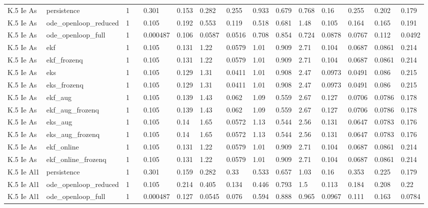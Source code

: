 \begin{table}[t]
\begin{tabular}{lllllllllllllll}
K.5 Ie As & persistence & 1 &  & 0.301 & 0.153 & 0.282 & 0.255 & 0.933 & 0.679 & 0.768 & 0.16 & 0.255 & 0.202 & 0.179 \\
K.5 Ie As & ode\_openloop\_reduced & 1 &  & 0.105 & 0.192 & 0.553 & 0.119 & 0.518 & 0.681 & 1.48 & 0.105 & 0.164 & 0.165 & 0.191 \\
K.5 Ie As & ode\_openloop\_full & 1 &  & 0.000487 & 0.106 & 0.0587 & 0.0516 & 0.708 & 0.854 & 0.724 & 0.0878 & 0.0767 & 0.112 & 0.0492 \\
K.5 Ie As & ekf & 1 &  & 0.105 & 0.131 & 1.22 & 0.0579 & 1.01 & 0.909 & 2.71 & 0.104 & 0.0687 & 0.0861 & 0.214 \\
K.5 Ie As & ekf\_frozenq & 1 &  & 0.105 & 0.131 & 1.22 & 0.0579 & 1.01 & 0.909 & 2.71 & 0.104 & 0.0687 & 0.0861 & 0.214 \\
K.5 Ie As & eks & 1 &  & 0.105 & 0.129 & 1.31 & 0.0411 & 1.01 & 0.908 & 2.47 & 0.0973 & 0.0491 & 0.086 & 0.215 \\
K.5 Ie As & eks\_frozenq & 1 &  & 0.105 & 0.129 & 1.31 & 0.0411 & 1.01 & 0.908 & 2.47 & 0.0973 & 0.0491 & 0.086 & 0.215 \\
K.5 Ie As & ekf\_aug & 1 &  & 0.105 & 0.139 & 1.43 & 0.062 & 1.09 & 0.559 & 2.67 & 0.127 & 0.0706 & 0.0786 & 0.178 \\
K.5 Ie As & ekf\_aug\_frozenq & 1 &  & 0.105 & 0.139 & 1.43 & 0.062 & 1.09 & 0.559 & 2.67 & 0.127 & 0.0706 & 0.0786 & 0.178 \\
K.5 Ie As & eks\_aug & 1 &  & 0.105 & 0.14 & 1.65 & 0.0572 & 1.13 & 0.544 & 2.56 & 0.131 & 0.0647 & 0.0783 & 0.176 \\
K.5 Ie As & eks\_aug\_frozenq & 1 &  & 0.105 & 0.14 & 1.65 & 0.0572 & 1.13 & 0.544 & 2.56 & 0.131 & 0.0647 & 0.0783 & 0.176 \\
K.5 Ie As & ekf\_online & 1 &  & 0.105 & 0.131 & 1.22 & 0.0579 & 1.01 & 0.909 & 2.71 & 0.104 & 0.0687 & 0.0861 & 0.214 \\
K.5 Ie As & ekf\_online\_frozenq & 1 &  & 0.105 & 0.131 & 1.22 & 0.0579 & 1.01 & 0.909 & 2.71 & 0.104 & 0.0687 & 0.0861 & 0.214 \\
K.5 Ie Al1 & persistence & 1 &  & 0.301 & 0.159 & 0.282 & 0.33 & 0.533 & 0.657 & 1.03 & 0.16 & 0.353 & 0.225 & 0.179 \\
K.5 Ie Al1 & ode\_openloop\_reduced & 1 &  & 0.105 & 0.214 & 0.405 & 0.134 & 0.446 & 0.793 & 1.5 & 0.113 & 0.184 & 0.208 & 0.22 \\
K.5 Ie Al1 & ode\_openloop\_full & 1 &  & 0.000487 & 0.127 & 0.0545 & 0.076 & 0.594 & 0.888 & 0.965 & 0.0967 & 0.111 & 0.163 & 0.0784 \\

\end{tabular}
\end{table}
